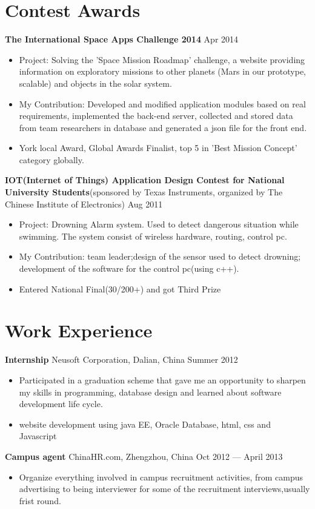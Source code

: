 \documentclass[margin]{res}
\begin{document}
\begin{resume}
\section{Contest Awards}   
{\bf The International Space Apps Challenge 2014}  \hfill Apr 2014
\begin{itemize} \itemsep -2pt
  \item Project: Solving the 'Space Mission Roadmap' challenge, a website
  providing information on exploratory missions to other planets (Mars in our
  prototype, scalable) and objects in the solar system.
  \item My Contribution: Developed and modified application modules based on
  real requirements, implemented the back-end server, collected and
  stored data from team researchers in database and generated a json file for
  the front end.
  \item York local Award, Global Awards Finalist, top 5 in 'Best Mission
  Concept' category globally.
\end{itemize}
{\bf IOT(Internet of Things) Application Design Contest for
National University Students}(sponsored by Texas Instruments, organized by The
Chinese Institute of Electronics) \hspace{\fill} Aug 2011\\  
\begin{itemize} \itemsep -2pt
   \item Project: Drowning Alarm system. Used to detect dangerous situation
   while swimming. The system consist of wireless hardware, routing, control pc.
   \item My Contribution: team leader;design of the sensor used to detect
   drowning; development of the software for the control pc(using c++).
   \item Entered National Final(30/200+) and got Third Prize
 \end{itemize}  
\section{Work Experience}
 {\bf Internship } Neusoft Corporation, Dalian, China \hfill Summer  2012
 \begin{itemize} \itemsep -2pt  %
  \item Participated in a graduation scheme that gave me an opportunity to
  sharpen my skills in programming, database design and learned about software
  development life cycle.
 \item website development using java EE, Oracle Database, html, css and
 Javascript
 \end{itemize}  
{\bf Campus agent} ChinaHR.com, Zhengzhou, China \hfill  Oct 2012 --- April 2013
\begin{itemize} \itemsep -2pt %
\item Organize everything involved in campus recruitment activities, from campus
advertising to being interviewer for some of the recruitment interviews,usually
frist round.
\end{itemize}


\end{resume}
\end{document}
